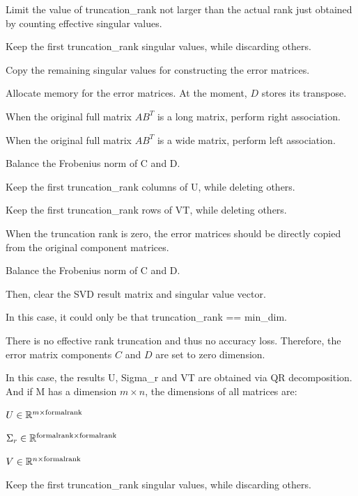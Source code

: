 Limit the value of {\ttfamily truncation\+\_\+rank} not larger than the actual rank just obtained by counting effective singular values.

Keep the first {\ttfamily truncation\+\_\+rank} singular values, while discarding others.

Copy the remaining singular values for constructing the error matrices.

Allocate memory for the error matrices. At the moment, $D$ stores its transpose.

When the original full matrix $AB^T$ is a long matrix, perform right association.

When the original full matrix $AB^T$ is a wide matrix, perform left association.

Balance the Frobenius norm of {\ttfamily C} and {\ttfamily D}.

Keep the first {\ttfamily truncation\+\_\+rank} columns of {\ttfamily U}, while deleting others.

Keep the first {\ttfamily truncation\+\_\+rank} rows of {\ttfamily VT}, while deleting others.

When the truncation rank is zero, the error matrices should be directly copied from the original component matrices.

Balance the Frobenius norm of {\ttfamily C} and {\ttfamily D}.

Then, clear the S\+VD result matrix and singular value vector.

In this case, it could only be that {\ttfamily truncation\+\_\+rank} == {\ttfamily min\+\_\+dim}.

There is no effective rank truncation and thus no accuracy loss. Therefore, the error matrix components $C$ and $D$ are set to zero dimension.

In this case, the results {\ttfamily U}, {\ttfamily Sigma\+\_\+r} and {\ttfamily VT} are obtained via QR decomposition. And if {\ttfamily M} has a dimension $m \times n$, the dimensions of all matrices are\+:
\begin{DoxyItemize}
\item $U \in \mathbb{R}^{m \times {\rm formal rank}}$
\item $\Sigma_r \in \mathbb{R}^{{\rm formal rank} \times {\rm formal rank}}$
\item $V \in \mathbb{R}^{n \times {\rm formal rank}}$
\end{DoxyItemize}

Keep the first {\ttfamily truncation\+\_\+rank} singular values, while discarding others.

